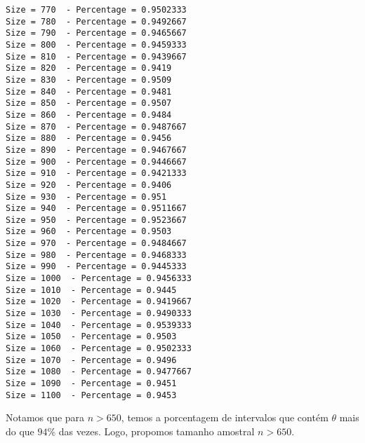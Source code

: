 \documentclass[11pt]{article}
\begin{document}
\begin{Verbatim}[commandchars=\\\{\}]
Size = 770  - Percentage = 0.9502333 
Size = 780  - Percentage = 0.9492667 
Size = 790  - Percentage = 0.9465667 
Size = 800  - Percentage = 0.9459333 
Size = 810  - Percentage = 0.9439667 
Size = 820  - Percentage = 0.9419 
Size = 830  - Percentage = 0.9509 
Size = 840  - Percentage = 0.9481 
Size = 850  - Percentage = 0.9507 
Size = 860  - Percentage = 0.9484 
Size = 870  - Percentage = 0.9487667 
Size = 880  - Percentage = 0.9456 
Size = 890  - Percentage = 0.9467667 
Size = 900  - Percentage = 0.9446667 
Size = 910  - Percentage = 0.9421333 
Size = 920  - Percentage = 0.9406 
Size = 930  - Percentage = 0.951 
Size = 940  - Percentage = 0.9511667 
Size = 950  - Percentage = 0.9523667 
Size = 960  - Percentage = 0.9503 
Size = 970  - Percentage = 0.9484667 
Size = 980  - Percentage = 0.9468333 
Size = 990  - Percentage = 0.9445333 
Size = 1000  - Percentage = 0.9456333 
Size = 1010  - Percentage = 0.9445 
Size = 1020  - Percentage = 0.9419667 
Size = 1030  - Percentage = 0.9490333 
Size = 1040  - Percentage = 0.9539333 
Size = 1050  - Percentage = 0.9503 
Size = 1060  - Percentage = 0.9502333 
Size = 1070  - Percentage = 0.9496 
Size = 1080  - Percentage = 0.9477667 
Size = 1090  - Percentage = 0.9451 
Size = 1100  - Percentage = 0.9453 

    \end{Verbatim}

    Notamos que para \(n > 650\), temos a porcentagem de intervalos que
contém \(\theta\) mais do que \(94\%\) das vezes. Logo, propomos tamanho
amostral \(n > 650\).


    
    
    
    
\end{document}
